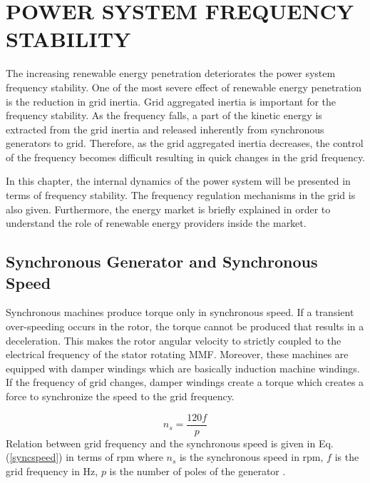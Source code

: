 \chapter{POWER SYSTEM FREQUENCY STABILITY}
\label{chp:2}
The increasing renewable energy penetration deteriorates the power system frequency stability. One of the most severe effect of renewable energy penetration is the reduction in grid inertia. Grid aggregated inertia is important for the frequency stability. As the frequency falls, a part of the kinetic energy is extracted from the grid inertia and released inherently from synchronous generators to grid. Therefore, as the grid aggregated inertia decreases, the control of the frequency becomes difficult resulting in quick changes in the grid frequency.\par
In this chapter, the internal dynamics of the power system will be presented in terms of frequency stability. The frequency regulation mechanisms in the grid is also given. Furthermore, the energy market is briefly explained in order to understand the role of renewable energy providers inside the market.
\section{Synchronous Generator and Synchronous Speed}
Synchronous machines produce torque only in synchronous speed. If a transient over-speeding occurs in the rotor, the torque cannot be produced that results in a deceleration. This makes the rotor angular velocity to strictly coupled to the electrical frequency  of the stator rotating MMF. Moreover, these machines are equipped with damper windings which are basically induction machine windings. If the frequency of  grid changes, damper windings create a torque which creates a force to synchronize the speed to the grid frequency. \par
\begin{equation}
n_{s}=\frac{120f}{p}
\label{syncspeed}
\end{equation}
Relation between grid frequency and the synchronous speed is given in Eq. (\ref{syncspeed}) in terms of rpm where $n_{s}$ is the synchronous speed in rpm, $f$ is the grid frequency in Hz, $p$ is the number of poles of the generator \cite{Kundur}.

